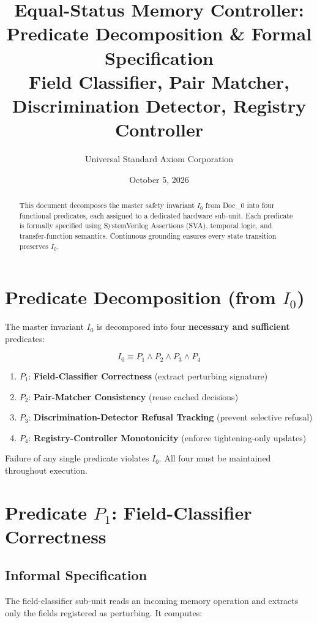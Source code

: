 \documentclass[11pt,oneside]{article}
\title{Equal-Status Memory Controller: Predicate Decomposition \& Formal Specification\\
\large Field Classifier, Pair Matcher, Discrimination Detector, Registry Controller}
\author{Universal Standard Axiom Corporation}
\date{October 5, 2026}
\begin{document}
\maketitle

\begin{abstract}
This document decomposes the master safety invariant $I_0$ from Doc\_0 into four functional predicates, each assigned to a dedicated hardware sub-unit. Each predicate is formally specified using SystemVerilog Assertions (SVA), temporal logic, and transfer-function semantics. Continuous grounding ensures every state transition preserves $I_0$.
\end{abstract}

\tableofcontents
\newpage

\section{Predicate Decomposition (from $I_0$)}

The master invariant $I_0$ is decomposed into four \textbf{necessary and sufficient} predicates:

\[
I_0 \equiv P_1 \land P_2 \land P_3 \land P_4
\]

\begin{enumerate}
\item $P_1$: \textbf{Field-Classifier Correctness} (extract perturbing signature)
\item $P_2$: \textbf{Pair-Matcher Consistency} (reuse cached decisions)
\item $P_3$: \textbf{Discrimination-Detector Refusal Tracking} (prevent selective refusal)
\item $P_4$: \textbf{Registry-Controller Monotonicity} (enforce tightening-only updates)
\end{enumerate}

Failure of any single predicate violates $I_0$. All four must be maintained throughout execution.

\section{Predicate $P_1$: Field-Classifier Correctness}

\subsection{Informal Specification}

The field-classifier sub-unit reads an incoming memory operation and extracts only the fields registered as perturbing. It computes:
\end{document}
